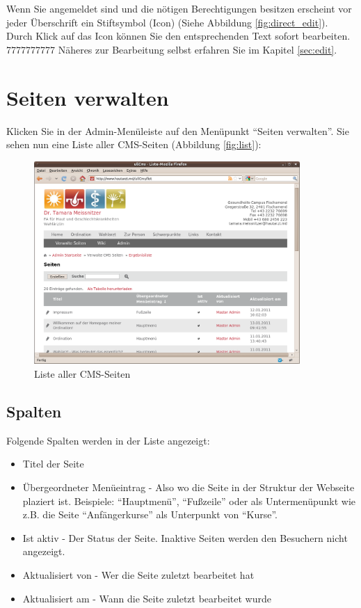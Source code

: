 \documentclass[article, a4paper, oneside, 11pt]{memoir}
\begin{document}
Wenn Sie angemeldet sind und die nötigen Berechtigungen besitzen erscheint vor jeder Überschrift ein Stiftsymbol (Icon) (Siehe Abbildung \vref{fig:direct_edit}). Durch Klick auf das Icon können Sie den entsprechenden Text sofort bearbeiten.
7777777777
Näheres zur Bearbeitung selbst erfahren Sie im Kapitel \vref{sec:edit}.




\section{Seiten verwalten}

Klicken Sie in der Admin-Menüleiste auf den Menüpunkt "`Seiten verwalten"'. Sie sehen nun eine Liste aller CMS-Seiten (Abbildung \vref{fig:list}):

\begin{figure}[htp]
\centering
\includegraphics[width=0.9\textwidth]{list}
\caption{Liste aller CMS-Seiten}
\label{fig:list}
\end{figure}


\subsection{Spalten}

Folgende Spalten werden in der Liste angezeigt:

\begin{itemize}
\item Titel der Seite
\item Übergeordneter Menüeintrag - Also wo die Seite in der Struktur der Webseite plaziert ist. Beispiele: "`Hauptmenü"', "`Fußzeile"' oder als Untermenüpunkt wie z.B. die Seite "`Anfängerkurse"' als Unterpunkt von "`Kurse"'.
\item Ist aktiv - Der Status der Seite. Inaktive Seiten werden den Besuchern nicht angezeigt.
\item Aktualisiert von - Wer die Seite zuletzt bearbeitet hat
\item Aktualisiert am - Wann die Seite zuletzt bearbeitet wurde
\end{itemize}
\end{document}
